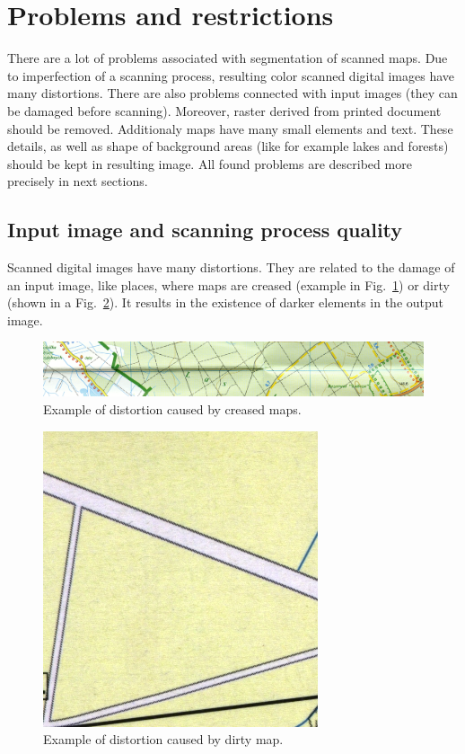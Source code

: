 \documentclass[a4paper,onecolumn,oneside,12pt]{memoir}
\begin{document}
\section{Problems and restrictions}

There are a lot of problems associated with segmentation of scanned maps. Due to imperfection of
a scanning process, resulting color scanned digital images have many distortions. There are also
problems connected with input images (they can be damaged before scanning). Moreover, raster derived
from printed document should be removed. Additionaly maps have many small elements and text. These
details, as well as shape of background areas (like for example lakes and forests) should be kept in
resulting image. All found problems are described more precisely in next sections.

\subsection{Input image and scanning process quality}

Scanned digital images have many distortions. They are related to the damage of an input image, like
places, where maps are creased (example in Fig.~\ref{creaseExample}) or dirty (shown in a 
Fig.~\ref{dirtyExample}). It results in the existence of darker elements in the output image.

\begin{figure}[!ht]
\begin{center}
\includegraphics[scale=1.1]{images/creaseExample.jpg}
\caption{Example of distortion caused by creased maps.}
\label{creaseExample}
\end{center}
\end{figure}

\begin{figure}[!ht]
\begin{center}
\includegraphics[scale=3.0]{images/dirtyExample.jpg}
\caption{Example of distortion caused by dirty map.}
\label{dirtyExample}
\end{center}
\end{figure}
\end{document}
